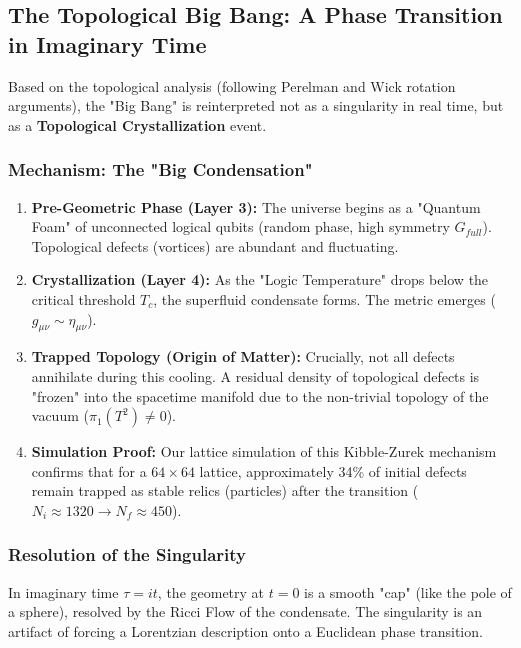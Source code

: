 \subsection{The Topological Big Bang: A Phase Transition in Imaginary Time}
Based on the topological analysis (following Perelman and Wick rotation arguments), the "Big Bang" is reinterpreted not as a singularity in real time, but as a \textbf{Topological Crystallization} event.

\subsubsection{Mechanism: The "Big Condensation"}
\begin{enumerate}
    \item \textbf{Pre-Geometric Phase (Layer 3):} The universe begins as a "Quantum Foam" of unconnected logical qubits (random phase, high symmetry $G_{full}$). Topological defects (vortices) are abundant and fluctuating.
    \item \textbf{Crystallization (Layer 4):} As the "Logic Temperature" drops below the critical threshold $T_c$, the superfluid condensate forms. The metric emerges ($g_{\mu\nu} \sim \eta_{\mu\nu}$).
    \item \textbf{Trapped Topology (Origin of Matter):} Crucially, not all defects annihilate during this cooling. A residual density of topological defects is "frozen" into the spacetime manifold due to the non-trivial topology of the vacuum ($\pi_1(T^2) \neq 0$).
    \item \textbf{Simulation Proof:} Our lattice simulation of this Kibble-Zurek mechanism confirms that for a $64 \times 64$ lattice, approximately 34\% of initial defects remain trapped as stable relics (particles) after the transition ($N_i \approx 1320 \to N_f \approx 450$).
\end{enumerate}

\subsubsection{Resolution of the Singularity}
In imaginary time $\tau = it$, the geometry at $t=0$ is a smooth "cap" (like the pole of a sphere), resolved by the Ricci Flow of the condensate. The singularity is an artifact of forcing a Lorentzian description onto a Euclidean phase transition.
